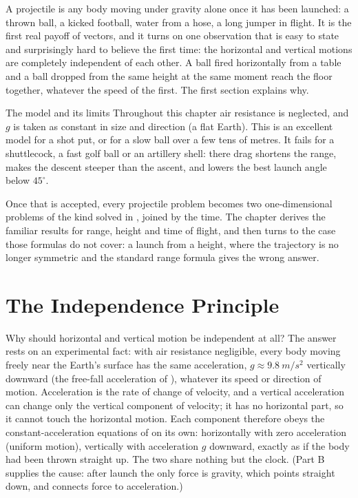 
A projectile is any body moving under gravity alone once it has been launched: a thrown ball, a kicked
football, water from a hose, a long jumper in flight. It is the first real payoff of vectors, and it
turns on one observation that is easy to state and surprisingly hard to believe the first time: the
horizontal and vertical motions are completely independent of each other. A ball fired horizontally
from a table and a ball dropped from the same height at the same moment reach the floor together,
whatever the speed of the first. The first section explains why.

\begin{remarkbox}{The model and its limits}
Throughout this chapter air resistance is neglected, and $g$ is taken as constant in size and direction
(a flat Earth). This is an excellent model for a shot put, or for a slow ball over a few tens of metres. It
fails for a shuttlecock, a fast golf ball or an artillery shell: there drag shortens the range, makes
the descent steeper than the ascent, and lowers the best launch angle below $45^\circ$.
\end{remarkbox}

Once that is accepted, every projectile problem becomes two one-dimensional problems of the kind solved in
, joined by the time. The chapter derives the familiar results for range, height and time of
flight, and then turns to the case those formulas do not cover: a launch from a height, where the
trajectory is no longer symmetric and the standard range formula gives the wrong answer.

\section{The Independence Principle}

Why should horizontal and vertical motion be independent at all? The answer rests on an experimental
fact: with air resistance negligible, every body moving freely near the Earth's surface has the same
acceleration, $g\approx\SI{9.8}{m/s^2}$ vertically downward (the free-fall acceleration of
), whatever its speed or direction of motion.
Acceleration is the rate of change of velocity, and a vertical acceleration can change only the vertical
component of velocity; it has no horizontal part, so it cannot touch the horizontal motion. Each
component therefore obeys the constant-acceleration equations of  on its own:
horizontally with zero acceleration (uniform motion), vertically with acceleration $g$ downward, exactly
as if the body had been thrown straight up. The two share nothing but the clock. (Part B supplies the cause: after launch the only force is
gravity, which points straight down, and  connects force to acceleration.)

